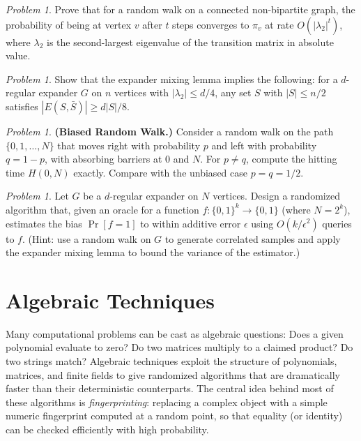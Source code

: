 \documentclass[twoside,12pt]{book}
\theoremstyle{plain}
\theoremstyle{definition}
\theoremstyle{remark}
\newtheorem{problem}[theorem]{Problem}
\begin{document}
\begin{problem}
Prove that for a random walk on a connected non-bipartite graph, the
probability of being at vertex $v$ after $t$ steps converges to $\pi_v$
at rate $O(|\lambda_2|^t)$, where $\lambda_2$ is the second-largest
eigenvalue of the transition matrix in absolute value.
\end{problem}

\begin{problem}
Show that the expander mixing lemma implies the following: for a
$d$-regular expander $G$ on $n$ vertices with $|\lambda_2| \leq d/4$, any
set $S$ with $|S| \leq n/2$ satisfies $|E(S, \bar{S})| \geq
d|S|/8$.
\end{problem}

\begin{problem}
\textbf{(Biased Random Walk.)} Consider a random walk on the path
$\{0, 1, \ldots, N\}$ that moves right with probability $p$ and left
with probability $q = 1 - p$, with absorbing barriers at $0$ and $N$.
For $p \neq q$, compute the hitting time $H(0, N)$ exactly. Compare with
the unbiased case $p = q = 1/2$.
\end{problem}

\begin{problem}
Let $G$ be a $d$-regular expander on $N$ vertices. Design a randomized
algorithm that, given an oracle for a function $f : \{0,1\}^k \to
\{0,1\}$ (where $N = 2^k$), estimates the bias $\Pr[f = 1]$ to within
additive error $\epsilon$ using $O(k/\epsilon^2)$ queries to $f$.
(Hint: use a random walk on $G$ to generate correlated samples and apply
the expander mixing lemma to bound the variance of the estimator.)
\end{problem}


\chapter{Algebraic Techniques}
\label{ch:algebraic}

Many computational problems can be cast as algebraic questions: Does a given polynomial evaluate to zero? Do two matrices multiply to a claimed product? Do two strings match? Algebraic techniques exploit the structure of polynomials, matrices, and finite fields to give randomized algorithms that are dramatically faster than their deterministic counterparts. The central idea behind most of these algorithms is \emph{fingerprinting}: replacing a complex object with a simple numeric fingerprint computed at a random point, so that equality (or identity) can be checked efficiently with high probability.
\end{document}
